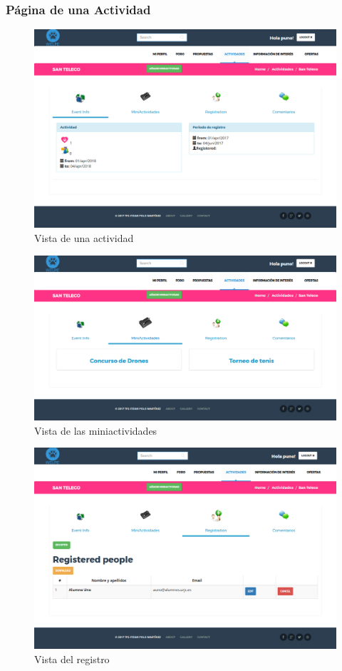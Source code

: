 \subsubsection{Página de una Actividad}
\label{subsubsec:actividad}
\begin{figure}[H]
\centering
\includegraphics[width=12cm]{img/actividad}
\caption{Vista de una actividad}
\label{figura:actividad}
\end{figure}
\begin{figure}[H]
\centering
\includegraphics[width=12cm]{img/actividad_miniactividad}
\caption{Vista de las miniactividades}
\label{figura:actividad_miniactividad}
\end{figure}
\begin{figure}[H]
\centering
\includegraphics[width=12cm]{img/actividad_registro}
\caption{Vista del registro}
\label{figura:actividad_registro}
\end{figure}
